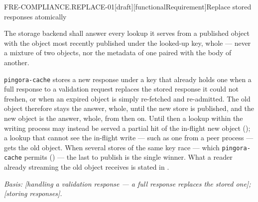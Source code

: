 \begin{requirement}{FRE-COMPLIANCE.REPLACE-01}[draft][functionalRequirement]{Replace stored responses atomically}


  The storage backend shall answer every lookup it serves from a published
  object with the object most recently published under the looked-up key,
  whole --- never a mixture of two objects, nor the metadata of one paired
  with the body of another.

  \texttt{pingora-cache} stores a new response under a key that already holds
  one when a full response to a validation request replaces the stored
  response it could not freshen, or when an expired object is simply
  re-fetched and re-admitted. The old object therefore stays the answer, whole,
  until the new store is published, and the new object is the answer, whole,
  from then on. Until then a lookup within the writing process may instead be
  served a partial hit of the in-flight new object
  (); a lookup that cannot see the in-flight
  write --- such as one from a peer process --- gets the old object. When
  several stores of the same key race --- which \texttt{pingora-cache}
  permits () --- the last to publish is the
  single winner. What a reader already streaming the old object receives is
  stated in .

  \textit{Basis: [handling a validation response --- a full
  response replaces the stored one]; [storing responses].}



\end{requirement}

